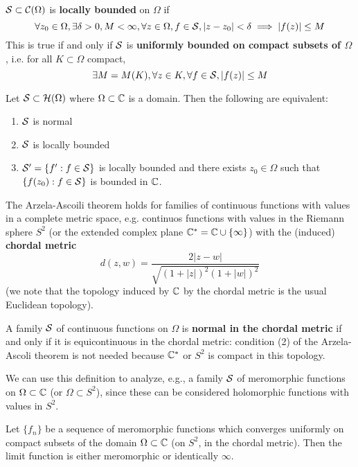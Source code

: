\documentclass{article}
\begin{document}
\begin{definition}
\(\mathcal{S} \subset \mathcal{C}(\Omega)\) is \textbf{locally bounded} on \(\Omega\) if
\begin{equation}\forall z_0 \in \Omega, \exists \delta > 0, M < \infty, \forall z \in \Omega, f \in \mathcal{S}, |z - z_0| < \delta \implies |f(z)| \leq M\end{equation}
This is true if and only if \(\mathcal{S}\) is \textbf{uniformly bounded on compact subsets of \(\Omega\)}, i.e. for all \(K \subset \Omega\) compact,
\begin{equation}\exists M = M(K), \forall z \in K, \forall f \in \mathcal{S}, |f(z)| \leq M\end{equation}
\end{definition}
\begin{theorem}[Montel]
Let \(\mathcal{S} \subset \mathcal{H}(\Omega)\) where \(\Omega \subset \mathbb{C}\) is a domain. Then the following are equivalent:
\begin{enumerate}

  \item \(\mathcal{S}\) is normal

  \item \(\mathcal{S}\) is locally bounded

  \item \(\mathcal{S}' = \{f' : f \in \mathcal{S}\}\) is locally bounded and there exists \(z_0 \in\Omega\) such that \(\{f(z_0) : f \in \mathcal{S}\}\) is bounded in \(\mathbb{C}\).

\end{enumerate}
\end{theorem}

The Arzela-Ascoili theorem holds for families of continuous functions with values in a complete metric space, e.g. continuos functions with values in the Riemann sphere \(S^2\) (or the extended complex plane \(\mathbb{C}^* = \mathbb{C} \cup \{\infty\}\)) with the (induced) \textbf{chordal metric}
\begin{equation}d(z, w) = \frac{2|z - w|}{\sqrt{(1 + |z|)^2(1 + |w|)^2}}\end{equation}
(we note that the topology induced by \(\mathbb{C}\) by the chordal metric is the usual Euclidean topology).
\begin{definition}
A family \(\mathcal{S}\) of continuous functions on \(\Omega\) is \textbf{normal in the chordal metric} if and only if it is equicontinuous in the chordal metric: condition (2) of the Arzela-Ascoli theorem is not needed because \(\mathbb{C}^*\) or \(S^2\) is compact in this topology.
\end{definition}
We can use this definition to analyze, e.g., a family \(\mathcal{S}\) of meromorphic functions on \(\Omega \subset \mathbb{C}\) (or \(\Omega \subset S^2\)), since these can be considered holomorphic functions with values in \(S^2\).
\begin{lemma}
Let \(\{f_n\}\) be a sequence of meromorphic functions which converges uniformly on compact subsets of the domain \(\Omega \subset \mathbb{C}\) (on \(S^2\), in the chordal metric). Then the limit function is either meromorphic or identically \(\infty\).
\end{lemma}
\end{document}
